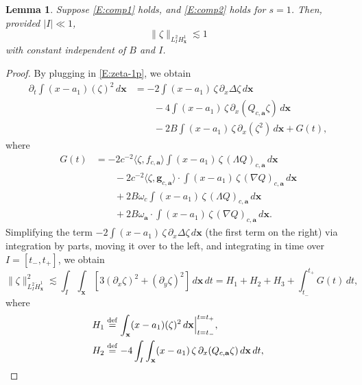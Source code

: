 \documentclass[12pt,letterpaper]{amsart}
\newcommand{\la}{\langle}
\newcommand{\ra}{\rangle}
\newcommand{\defeq}{\stackrel{\rm{def}}{=}}
\newtheorem{lemma}[theorem]{Lemma}
\theoremstyle{remark}
\numberwithin{equation}{section}
\numberwithin{theorem}{section}
\numberwithin{table}{section}
\begin{document}
\begin{lemma}
\label{L:comp1}
Suppose \eqref{E:comp1} holds, and \eqref{E:comp2} holds for $s=1$.  Then, provided $|I| \ll 1$, 
\begin{equation}
\label{E:comp3}
\| \zeta \|_{L_I^2 H_{\mathbf{x}}^1} \lesssim 1
\end{equation}
with constant independent of $B$ and $I$.
\end{lemma}
\begin{proof}
By plugging in \eqref{E:zeta-1p}, we obtain
\begin{align*}
\partial_t \int (x-a_1) ( \zeta)^2 \, d\mathbf{x} 
&= -2 \int (x-a_1) \,  \zeta \, \partial_x \Delta  \zeta \, d\mathbf{x} \\
& \qquad - 4 \int (x-a_1) \,  \zeta \, \partial_x  ( Q_{c,\mathbf{a}} \zeta) \, d\mathbf{x} \\
& \qquad - 2 B \int (x-a_1) \,  \zeta \, \partial_x  ( \zeta^2) \, d \mathbf{x} + G(t),
\end{align*}
where
\begin{align*}
G(t) &= -2 c^{-2} \la \zeta, f_{c,\mathbf{a}}\ra  \int (x-a_1) \,  \zeta \,  (\Lambda Q)_{c,\mathbf{a}} \, d\mathbf{x} \\
& \qquad -2 c^{-2} \la \zeta, \mathbf{g}_{c,\mathbf{a}} \ra  \cdot  \int (x-a_1) \,  \zeta \,  (\nabla Q)_{c,\mathbf{a}} \, d\mathbf{x}  \\
& \qquad + 2B \omega_c \int (x-a_1) \, \zeta \, ( \Lambda Q)_{c,\mathbf{a}} \, d\mathbf{x} \\
& \qquad + 2B \omega_{\mathbf{a}} \cdot \int (x-a_1) \,  \zeta \, (\nabla Q)_{c,\mathbf{a}} \, d \mathbf{x}.
\end{align*}
Simplifying the term $-2 \int (x-a_1) \,  \zeta \, \partial_x \Delta  \zeta \, d\mathbf{x}$ (the first term on the right) via integration by parts, moving it over to the left, and integrating in time over $I=[t_-,t_+]$, we obtain
\begin{equation}
\label{E:comp17}
\| \zeta \|_{L_I^2 \dot H_{\mathbf{x}}^1}^2 \lesssim \int_I\int_{\mathbf{x}} [3 (\partial_x  \zeta)^2 + (\partial_y \zeta)^2]  \, d\mathbf{x} \, dt = H_1+H_2+H_3 + \int_{t_-}^{t_+}G(t) \,dt,
\end{equation}
where
\begin{align*}
H_1 &\defeq \int_{\mathbf{x}} (x-a_1) ( \zeta)^2 \, d\mathbf{x}  \Big|^{t=t_+}_{t=t_-},  \\
H_2 &\defeq - 4 \int_I \int_{\mathbf{x}} (x-a_1) \,  \zeta \, \partial_x  ( Q_{c,\mathbf{a}} \zeta) \, d\mathbf{x} \, dt, \\

\end{align*}
\end{proof}
\end{document}
